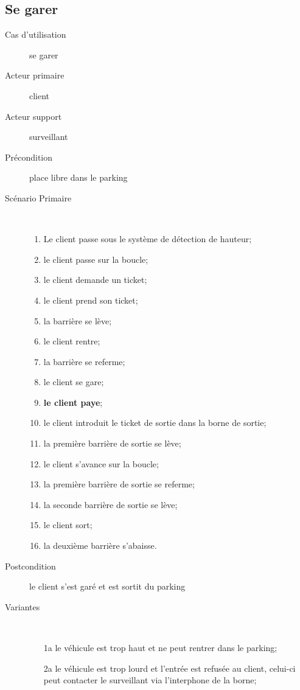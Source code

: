 \documentclass[a4paper]{article}
\begin{document}
\subsection{Se garer}
\begin{description}
	\item[Cas d'utilisation] se garer
	\item[Acteur primaire] client
	\item[Acteur support] surveillant
	\item[Pr\'econdition] place libre dans le parking
	\item[Sc\'enario Primaire] \
	\begin{enumerate}
		\item Le client passe sous le syst\`eme de d\'etection de hauteur;
		\item le client passe sur la boucle;
		\item le client demande un ticket;
		\item le client prend son ticket;
		\item la barri\`ere se l\`eve;
		\item le client rentre;
		\item la barri\`ere se referme;
		\item le client se gare;
		\item \textbf{le client paye};
		\item le client introduit le ticket de sortie dans la borne de sortie;
		\item la premi\`ere barri\`ere de sortie se l\`eve;
		\item le client s'avance sur la boucle;
		\item la premi\`ere barri\`ere de sortie se referme;
		\item la seconde barri\`ere de sortie se l\`eve;
		\item le client sort;
		\item la deuxi\`eme barri\`ere s'abaisse.
	\end{enumerate}
	\item[Postcondition] le client s'est gar\'e et est sortit du parking
	\item[Variantes] \
	\begin{enumerate}
		\item[1a] le v\'ehicule est trop haut et ne peut rentrer dans
			le parking;
		\item[2a] le v\'ehicule est trop lourd et l'entr\'ee est
			refus\'ee au client, celui-ci peut contacter le surveillant
			via l'interphone de la borne;

\end{enumerate}
\end{description}
\end{document}
